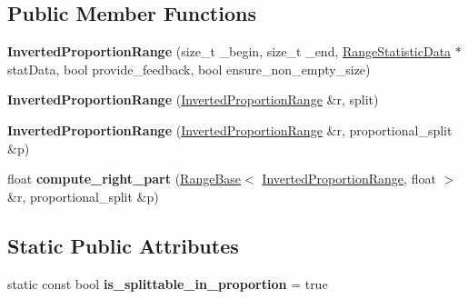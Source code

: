 \subsection*{Public Member Functions}
\begin{DoxyCompactItemize}
\item 
\hypertarget{classtest__partitioner__utils_1_1TestRanges_1_1InvertedProportionRange_a1ff90c7941805b60d7fda4d6e10d6ad3}{}{\bfseries Inverted\+Proportion\+Range} (size\+\_\+t \+\_\+begin, size\+\_\+t \+\_\+end, \hyperlink{structtest__partitioner__utils_1_1RangeStatisticData}{Range\+Statistic\+Data} $\ast$stat\+Data, bool provide\+\_\+feedback, bool ensure\+\_\+non\+\_\+empty\+\_\+size)\label{classtest__partitioner__utils_1_1TestRanges_1_1InvertedProportionRange_a1ff90c7941805b60d7fda4d6e10d6ad3}

\item 
\hypertarget{classtest__partitioner__utils_1_1TestRanges_1_1InvertedProportionRange_a289ccf49e16de986c4ba551f5acf3f94}{}{\bfseries Inverted\+Proportion\+Range} (\hyperlink{classtest__partitioner__utils_1_1TestRanges_1_1InvertedProportionRange}{Inverted\+Proportion\+Range} \&r, split)\label{classtest__partitioner__utils_1_1TestRanges_1_1InvertedProportionRange_a289ccf49e16de986c4ba551f5acf3f94}

\item 
\hypertarget{classtest__partitioner__utils_1_1TestRanges_1_1InvertedProportionRange_a70977986bb6196be7c0d996da20184d7}{}{\bfseries Inverted\+Proportion\+Range} (\hyperlink{classtest__partitioner__utils_1_1TestRanges_1_1InvertedProportionRange}{Inverted\+Proportion\+Range} \&r, proportional\+\_\+split \&p)\label{classtest__partitioner__utils_1_1TestRanges_1_1InvertedProportionRange_a70977986bb6196be7c0d996da20184d7}

\item 
\hypertarget{classtest__partitioner__utils_1_1TestRanges_1_1InvertedProportionRange_a9a961aecfc8e49e377d46c63d7527d8a}{}float {\bfseries compute\+\_\+right\+\_\+part} (\hyperlink{classtest__partitioner__utils_1_1RangeBase}{Range\+Base}$<$ \hyperlink{classtest__partitioner__utils_1_1TestRanges_1_1InvertedProportionRange}{Inverted\+Proportion\+Range}, float $>$ \&r, proportional\+\_\+split \&p)\label{classtest__partitioner__utils_1_1TestRanges_1_1InvertedProportionRange_a9a961aecfc8e49e377d46c63d7527d8a}

\end{DoxyCompactItemize}
\subsection*{Static Public Attributes}
\begin{DoxyCompactItemize}
\item 
\hypertarget{classtest__partitioner__utils_1_1TestRanges_1_1InvertedProportionRange_a6715d657c34854b9e6dd74e060e796fc}{}static const bool {\bfseries is\+\_\+splittable\+\_\+in\+\_\+proportion} = true\label{classtest__partitioner__utils_1_1TestRanges_1_1InvertedProportionRange_a6715d657c34854b9e6dd74e060e796fc}

\end{DoxyCompactItemize}
